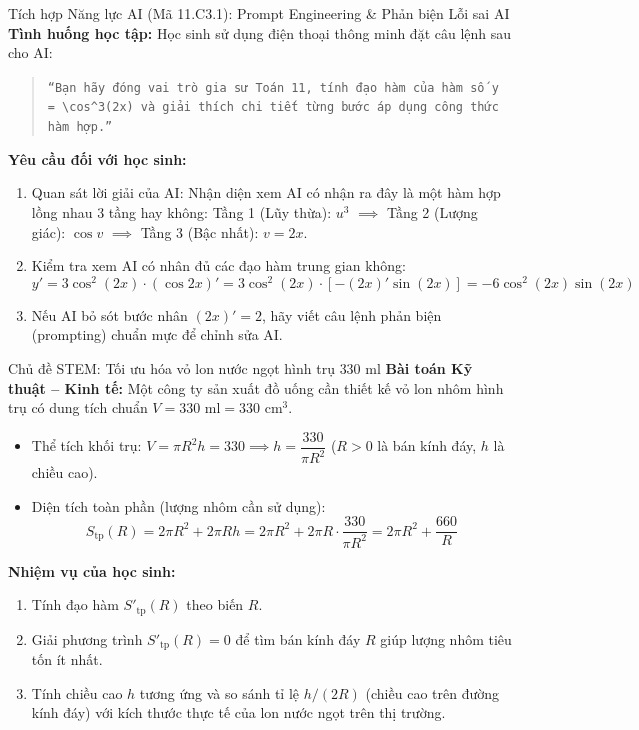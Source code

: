 \documentclass[12pt, a4paper]{article}
\begin{document}
\begin{aibox}{Tích hợp Năng lực AI (Mã 11.C3.1): Prompt Engineering & Phản biện Lỗi sai AI}
\textbf{Tình huống học tập:} Học sinh sử dụng điện thoại thông minh đặt câu lệnh sau cho AI:
\begin{quote}
    \small
    \texttt{``Bạn hãy đóng vai trò gia sư Toán 11, tính đạo hàm của hàm số $y = \cos^3(2x)$ và giải thích chi tiết từng bước áp dụng công thức hàm hợp.''}
\end{quote}
\textbf{Yêu cầu đối với học sinh:}
\begin{enumerate}[leftmargin=0.6cm]
    \item Quan sát lời giải của AI: Nhận diện xem AI có nhận ra đây là một hàm hợp lồng nhau 3 tầng hay không:
    Tầng 1 (Lũy thừa): $u^3$ $\implies$ Tầng 2 (Lượng giác): $\cos v$ $\implies$ Tầng 3 (Bậc nhất): $v = 2x$.
    \item Kiểm tra xem AI có nhân đủ các đạo hàm trung gian không:
    $$y' = 3\cos^2(2x) \cdot (\cos 2x)' = 3\cos^2(2x) \cdot \left[ -(2x)' \sin(2x) \right] = -6\cos^2(2x)\sin(2x)$$
    \item Nếu AI bỏ sót bước nhân $(2x)' = 2$, hãy viết câu lệnh phản biện (prompting) chuẩn mực để chỉnh sửa AI.
\end{enumerate}
\end{aibox}

\begin{stembox}{Chủ đề STEM: Tối ưu hóa vỏ lon nước ngọt hình trụ $330\text{ ml}$}
\textbf{Bài toán Kỹ thuật -- Kinh tế:} Một công ty sản xuất đồ uống cần thiết kế vỏ lon nhôm hình trụ có dung tích chuẩn $V = 330\text{ ml} = 330\text{ cm}^3$.
\begin{itemize}[leftmargin=0.5cm]
    \item Thể tích khối trụ: $V = \pi R^2 h = 330 \implies h = \dfrac{330}{\pi R^2}$ ($R > 0$ là bán kính đáy, $h$ là chiều cao).
    \item Diện tích toàn phần (lượng nhôm cần sử dụng):
    $$S_{\text{tp}}(R) = 2\pi R^2 + 2\pi R h = 2\pi R^2 + 2\pi R \cdot \dfrac{330}{\pi R^2} = 2\pi R^2 + \dfrac{660}{R}$$
\end{itemize}
\textbf{Nhiệm vụ của học sinh:}
\begin{enumerate}[leftmargin=0.6cm]
    \item Tính đạo hàm $S'_{\text{tp}}(R)$ theo biến $R$.
    \item Giải phương trình $S'_{\text{tp}}(R) = 0$ để tìm bán kính đáy $R$ giúp lượng nhôm tiêu tốn ít nhất.
    \item Tính chiều cao $h$ tương ứng và so sánh tỉ lệ $h / (2R)$ (chiều cao trên đường kính đáy) với kích thước thực tế của lon nước ngọt trên thị trường.
\end{enumerate}
\end{stembox}
\end{document}
